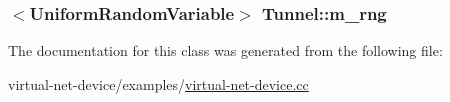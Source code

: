 \subsubsection[{\texorpdfstring{m\+\_\+rng}{m_rng}}]{$<${\bf Uniform\+Random\+Variable}$>$ Tunnel\+::m\+\_\+rng\hspace{0.3cm}{\ttfamily [private]}}\hypertarget{classTunnel_a94fb22a67d997fe13a70328b40f81859}{}\label{classTunnel_a94fb22a67d997fe13a70328b40f81859}


The documentation for this class was generated from the following file\+:\begin{DoxyCompactItemize}
\item 
virtual-\/net-\/device/examples/\hyperlink{examples_2virtual-net-device_8cc}{virtual-\/net-\/device.\+cc}\end{DoxyCompactItemize}
